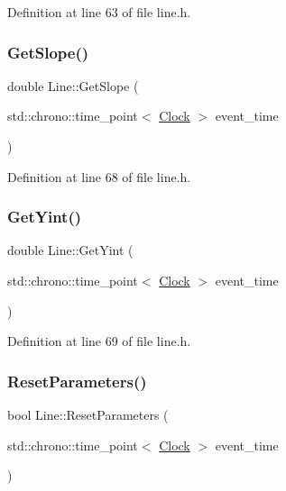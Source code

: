 Definition at line 63 of file line.\+h.

\mbox{\label{class_line_a2be3926d47a1a8849007a6c29a603dcf}} 
\subsubsection{\texorpdfstring{Get\+Slope()}{GetSlope()}}
{\footnotesize\ttfamily double Line\+::\+Get\+Slope (\begin{DoxyParamCaption}\item[{std\+::chrono\+::time\+\_\+point$<$ \hyperlink{universe_8h_a0ef8d951d1ca5ab3cfaf7ab4c7a6fd80}{Clock} $>$}]{event\+\_\+time }\end{DoxyParamCaption})\hspace{0.3cm}{\ttfamily [inline]}}



Definition at line 68 of file line.\+h.

\mbox{\label{class_line_a5319d68ecb254ff61e2a46d5928aec93}} 
\subsubsection{\texorpdfstring{Get\+Yint()}{GetYint()}}
{\footnotesize\ttfamily double Line\+::\+Get\+Yint (\begin{DoxyParamCaption}\item[{std\+::chrono\+::time\+\_\+point$<$ \hyperlink{universe_8h_a0ef8d951d1ca5ab3cfaf7ab4c7a6fd80}{Clock} $>$}]{event\+\_\+time }\end{DoxyParamCaption})\hspace{0.3cm}{\ttfamily [inline]}}



Definition at line 69 of file line.\+h.

\mbox{\label{class_line_af1756d1500ab0a5616313be6e213015a}} 
\subsubsection{\texorpdfstring{Reset\+Parameters()}{ResetParameters()}}
{\footnotesize\ttfamily bool Line\+::\+Reset\+Parameters (\begin{DoxyParamCaption}\item[{std\+::chrono\+::time\+\_\+point$<$ \hyperlink{universe_8h_a0ef8d951d1ca5ab3cfaf7ab4c7a6fd80}{Clock} $>$}]{event\+\_\+time }\end{DoxyParamCaption})}

